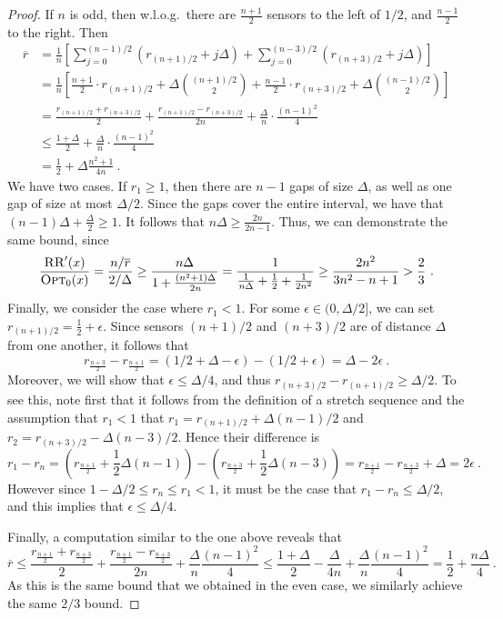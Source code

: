 \documentclass[11pt]{article}
\newcommand{\paren}[1]{\left( #1 \right)}
\newcommand{\inv}[1]{\frac{1}{#1}}
\newcommand{\half}{\frac{1}{2}}
\newcommand{\RR}{\textsc{RR}\xspace}
\newcommand{\opt}{\textsc{Opt}\xspace}
\begin{document}
\begin{proof}
If $n$ is odd, then w.l.o.g.\ 
there are $\frac{n+1}{2}$ sensors to the left of $1/2$, and
$\frac{n-1}{2}$ to the right.  Then
\begin{align*}
\overline{r} 
& = \inv{n} 
       \left[ \sum_{j=0}^{(n-1)/2} (r_{(n+1)/2} + j \Delta)  + 
              \sum_{j=0}^{(n-3)/2} (r_{(n+3)/2} + j \Delta) 
       \right] \\
& = \frac{1}{n} 
       \left[ \frac{n+1}{2} \cdot r_{(n+1)/2} + 
              \Delta \binom{(n+1)/2}{2} + 
              \frac{n-1}{2} \cdot r_{(n+3)/2} + 
              \Delta \binom{(n-1)/2}{2}
       \right] \\
& =    \frac{r_{(n+1)/2} + r_{(n+3)/2}}{2} + 
       \frac{r_{(n+1)/2} - r_{(n+3)/2}}{2n} +
       \frac{\Delta}{n} \cdot \frac{(n-1)^2}{4}  \\
& \leq \frac{1+\Delta}{2} + \frac{\Delta}{n} \cdot \frac{(n-1)^2}{4} \\
& =    \frac{1}{2} + \Delta \frac{n^2 + 1}{4n} 
~.
\end{align*}
We have two cases. 
If $r_1 \geq 1$, then there are $n-1$ gaps of size $\Delta$, as
well as one gap of size at most $\Delta/2$. Since the gaps cover the
entire interval, we have that $(n-1)\Delta + \frac{\Delta}{2} \geq 1$.
It follows that $n\Delta \geq \frac{2n}{2n-1}$.  Thus, we can
demonstrate the same bound, since
\[
\frac{\RR'(x)}{\opt_0(x)} 
=    \frac{n/\overline{r}}{2/\Delta}
\geq \frac{n \Delta}{1 + \frac{(n^2+1) \Delta}{2n}} 
=    \frac{1}{\frac{1}{n\Delta} + \frac{1}{2} + \frac{1}{2n^2}} 
\geq \frac{2n^2}{3n^2 -n + 1} 
>    \frac{2}{3} 
~.
\]
Finally, we consider the case where $r_1 < 1$.  For some $\epsilon
\in (0,\Delta/2]$, we can set $r_{(n+1)/2} = \frac{1}{2} + \epsilon$.
Since sensors $(n+1)/2$ and $(n+3)/2$ are of distance $\Delta$ from
one another, it follows that
\[
r_{\frac{n+3}{2}} - r_{\frac{n+1}{2}} 
= \paren{1/2 + \Delta - \epsilon} - \paren{1/2 + \epsilon}
= \Delta - 2 \epsilon 
~.
\]
Moreover, we will show that $\epsilon \leq \Delta /4$, and thus
$r_{(n+3)/2} - r_{(n+1)/2} \geq \Delta/2$.  To see this, note first
that it follows from the definition of a stretch sequence and the
assumption that $r_1 < 1$ that $r_1 = r_{(n+1)/2} + \Delta (n-1)/2$
and $r_2 = r_{(n+3)/2} - \Delta (n-3)/2$.  Hence their difference is
\[\textstyle
r_1 - r_n 
= ( r_{\frac{n+1}{2}} + \half \Delta (n-1) ) - 
  ( r_{\frac{n+3}{2}} + \half \Delta (n-3) )
= r_{\frac{n+1}{2}} - r_{\frac{n+3}{2}} + \Delta
= 2\epsilon 
~.
\]
However since $1-\Delta/2 \leq r_n \leq r_1 < 1$, it must be the case
that $r_1-r_n \leq \Delta/2$, and this implies that $\epsilon \leq
\Delta/4$.

Finally, a computation similar to the one above reveals that
\[
\overline{r} 
\leq \frac{r_{\frac{n+1}{2}} + r_{\frac{n+3}{2}}}{2} + 
       \frac{r_{\frac{n+1}{2}} - r_{\frac{n+3}{2}}}{2n} +
       \frac{\Delta}{n} \frac{(n-1)^2}{4} 
\leq \frac{1+\Delta}{2} - \frac{\Delta}{4n} + 
       \frac{\Delta}{n}  \frac{(n-1)^2}{4} 
=    \frac{1}{2} + \frac{n \Delta}{4} 
~.
\]
As this is the same bound that we obtained in the even case, we
similarly achieve the same $2/3$ bound. 
\end{proof}
\end{document}
